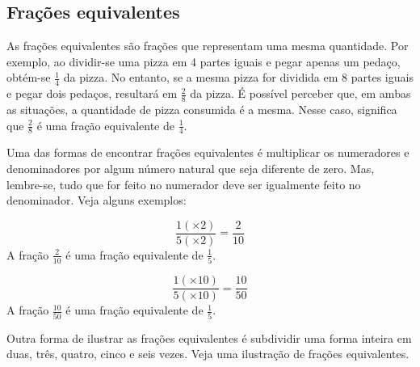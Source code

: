     \subsection{Frações equivalentes}
    
	As frações equivalentes são frações que representam uma mesma quantidade. Por exemplo, ao dividir-se uma pizza em 4 partes iguais e pegar apenas um pedaço, obtém-se $\frac{1}{4}$ da pizza. No entanto, se a mesma pizza for dividida em 8 partes iguais e pegar dois pedaços, resultará em $\frac{2}{8}$ da pizza. É possível perceber que, em ambas as situações, a quantidade de pizza consumida é a mesma. Nesse caso, significa que $\frac{2}{8}$ é uma fração equivalente de $\frac{1}{4}$.
	
	Uma das formas de encontrar frações equivalentes é multiplicar os numeradores e denominadores por algum número natural que seja diferente de zero. Mas, lembre-se, tudo que for feito no numerador deve ser igualmente feito no denominador. Veja alguns exemplos:

        \begin{texample}
        \centering
        \end{texample}        
    
        \begin{tcolorbox}[colback=white,colframe=minha_cor,coltitle=black,title=Formas Equivalentes] 
            \begin{minipage}{0.45\textwidth}
			\begin{equation}
				\frac{1(\times 2)}{5(\times 2)} = \frac{2}{10} 
				\nonumber
		      \end{equation}
		      A fração $\frac{2}{10}$ é uma fração equivalente de $\frac{1}{5}$.
		\end{minipage}
            \hspace{1cm}
		\begin{minipage}{0.45\textwidth}
					\begin{equation}
						\frac{1(\times 10)}{5(\times 10)} = \frac{10}{50}   \nonumber
					\end{equation}
					A fração $\frac{10}{50}$ é uma fração equivalente de $\frac{1}{5}$.
				\end{minipage}
            \end{tcolorbox}
	Outra forma de ilustrar as frações equivalentes é subdividir uma forma inteira em duas, três, quatro, cinco e seis vezes. Veja uma ilustração de frações equivalentes.
        
